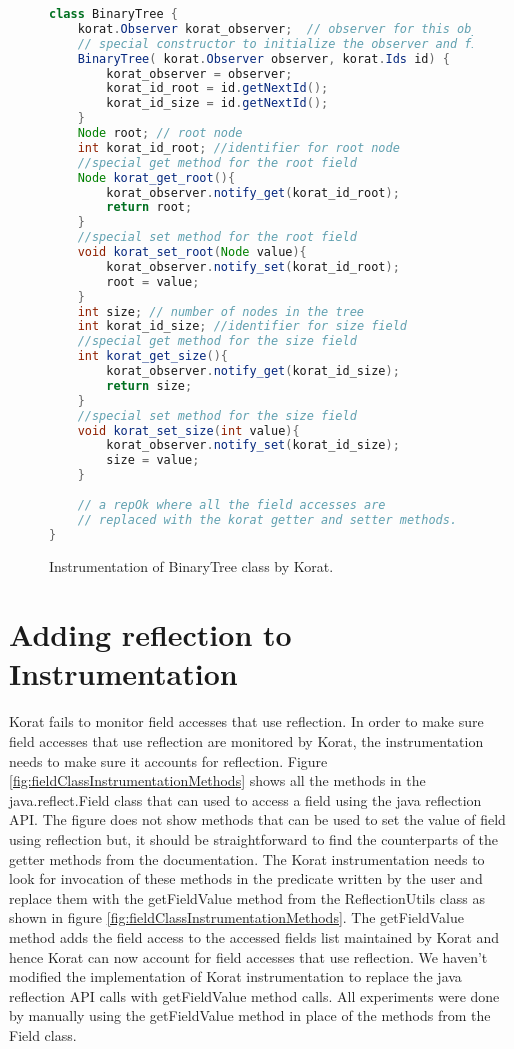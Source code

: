 \begin{figure}
\centering
\begin{lstlisting}[language=Java]
class BinaryTree {
    korat.Observer korat_observer;  // observer for this object
    // special constructor to initialize the observer and field ids
    BinaryTree( korat.Observer observer, korat.Ids id) {
        korat_observer = observer;
        korat_id_root = id.getNextId();
        korat_id_size = id.getNextId();
    }
    Node root; // root node
    int korat_id_root; //identifier for root node
    //special get method for the root field
    Node korat_get_root(){
        korat_observer.notify_get(korat_id_root);
        return root;
    }
    //special set method for the root field
    void korat_set_root(Node value){
        korat_observer.notify_set(korat_id_root);
        root = value;
    }
    int size; // number of nodes in the tree
    int korat_id_size; //identifier for size field
    //special get method for the size field
    int korat_get_size(){ 
        korat_observer.notify_get(korat_id_size);
        return size;
    }
    //special set method for the size field
    void korat_set_size(int value){ 
        korat_observer.notify_set(korat_id_size);
        size = value;
    }
   
    // a repOk where all the field accesses are 
    // replaced with the korat getter and setter methods.
}
\end{lstlisting}
\caption{Instrumentation of BinaryTree class by Korat.}
\label{fig:btTreeInstrumentationKorat}
\end{figure}


\section{Adding reflection to Instrumentation}
\label{sec:adding-reflection-to-instrumentation}
Korat fails to monitor field accesses that use reflection. In order to
make sure field accesses that use reflection are monitored by Korat,
the instrumentation needs to make sure it accounts for
reflection. Figure \ref{fig:fieldClassInstrumentationMethods} shows
all the methods in the java.reflect.Field class that can used to
access a field using the java reflection API. The figure does not show
methods that can be used to set the value of field using reflection
but, it should be straightforward to find the counterparts of the
getter methods from the documentation. The Korat instrumentation needs
to look for invocation of these methods in the predicate written by
the user and replace them with the getFieldValue method from the
ReflectionUtils class as shown in figure
\ref{fig:fieldClassInstrumentationMethods}. The getFieldValue method
adds the field access to the accessed fields list maintained by Korat
and hence Korat can now account for field accesses that use
reflection. We haven’t modified the implementation of Korat
instrumentation to replace the java reflection API calls with
getFieldValue method calls. All experiments were done by manually
using the getFieldValue method in place of the methods from the Field
class.

